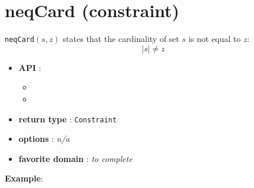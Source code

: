 \label{neqcard}
\hypertarget{neqcard}{}

\section{neqCard (constraint)}\label{neqcard:neqcardconstraint}\hypertarget{neqcard:neqcardconstraint}{}
\begin{notedef}
  \texttt{neqCard}$(s,z)$ states that the cardinality of set $s$ is not equal to $z$:
$$|s| \neq z$$
\end{notedef}

\begin{itemize}
	\item \textbf{API} :
	\begin{itemize}
		\item {}
		\item {}
	\end{itemize}
	\item \textbf{return type} : \texttt{Constraint}
	\item \textbf{options} : \emph{n/a}
	\item \textbf{favorite domain} : \emph{to complete}
\end{itemize}

\textbf{Example}:


